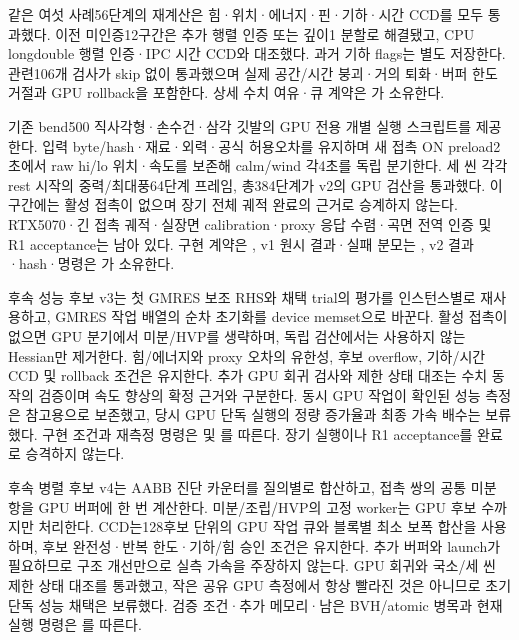 \documentclass[10pt]{article}
\begin{document}
같은 여섯 사례56단계의 재계산은 힘·위치·에너지·핀·기하·시간 CCD를 모두 통과했다.
이전 미인증12구간은 추가 행렬 인증 또는 깊이1 분할로 해결됐고,
CPU longdouble 행렬 인증·IPC 시간 CCD와 대조했다. 과거 기하 flags는 별도 저장한다.
관련106개 검사가 skip 없이 통과했으며 실제 공간/시간 붕괴·거의 퇴화·버퍼 한도 거절과
GPU rollback을 포함한다. 상세 수치 여유·큐 계약은
가 소유한다.

기존 bend500 직사각형·손수건·삼각 깃발의 GPU 전용 개별 실행 스크립트를 제공한다.
입력 byte/hash·재료·외력·공식 허용오차를 유지하며 새 접촉 ON preload2초에서
raw hi/lo 위치·속도를 보존해 calm/wind 각4초를 독립 분기한다. 세 씬 각각 rest 시작의
중력/최대풍64단계 프레임, 총384단계가 v2의 GPU 검산을 통과했다.
이 구간에는 활성 접촉이 없으며 장기 전체 궤적 완료의 근거로 승계하지 않는다.
RTX5070·긴 접촉 궤적·실장면 calibration·proxy 응답 수렴·곡면 전역 인증 및 R1 acceptance는 남아 있다.
구현 계약은 , v1 원시 결과·실패 분모는
, v2 결과·hash·명령은
가 소유한다.

후속 성능 후보 v3는 첫 GMRES 보조 RHS와 채택 trial의 평가를 인스턴스별로 재사용하고,
GMRES 작업 배열의 순차 초기화를 device memset으로 바꾼다. 활성 접촉이 없으면
GPU 분기에서 미분/HVP를 생략하며, 독립 검산에서는 사용하지 않는 Hessian만 제거한다.
힘/에너지와 proxy 오차의 유한성, 후보 overflow, 기하/시간 CCD 및 rollback 조건은 유지한다.
추가 GPU 회귀 검사와 제한 상태 대조는 수치 동작의 검증이며 속도 향상의 확정 근거와 구분한다.
동시 GPU 작업이 확인된 성능 측정은 참고용으로 보존했고, 당시 GPU 단독 실행의
정량 증가율과 최종 가속 배수는 보류했다. 구현 조건과 재측정 명령은
 및
를 따른다.
장기 실행이나 R1 acceptance를 완료로 승격하지 않는다.

후속 병렬 후보 v4는 AABB 진단 카운터를 질의별로 합산하고, 접촉 쌍의 공통 미분 항을
GPU 버퍼에 한 번 계산한다. 미분/조립/HVP의 고정 worker는 GPU 후보 수까지만 처리한다.
CCD는128후보 단위의 GPU 작업 큐와 블록별 최소 보폭 합산을 사용하며,
후보 완전성·반복 한도·기하/힘 승인 조건은 유지한다. 추가 버퍼와 launch가 필요하므로
구조 개선만으로 실측 가속을 주장하지 않는다. GPU 회귀와 국소/세 씬 제한 상태 대조를 통과했고,
작은 공유 GPU 측정에서 항상 빨라진 것은 아니므로 초기 단독 성능 채택은 보류했다.
검증 조건·추가 메모리·남은 BVH/atomic 병목과 현재 실행 명령은
를 따른다.
\end{document}
